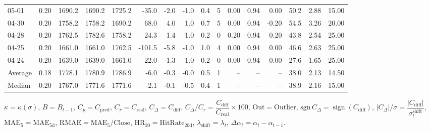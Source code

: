 \begin{threeparttable}
{\begin{tabular}{lrrrrrrrrrrrrrrr}
  05-01 &     0.20 & 1690.2 & 1690.2 & 1725.2 &      -35.0 &           -2.0 &                     -1.0 &                 0.4 &              5 &       0.00 &      0.94 &           0.00 &             50.2 &            2.88 &                  15.00 \\
  04-30 &     0.20 & 1758.2 & 1758.2 & 1690.2 &       68.0 &            4.0 &                      1.0 &                 0.7 &              5 &       0.00 &      0.94 &          -0.20 &             54.5 &            3.26 &                  20.00 \\
  04-28 &     0.20 & 1762.5 & 1782.6 & 1758.2 &       24.3 &            1.4 &                      1.0 &                 0.2 &              0 &       0.20 &      0.94 &           0.20 &             43.8 &            2.54 &                  25.00 \\
  04-25 &     0.20 & 1661.0 & 1661.0 & 1762.5 &     -101.5 &           -5.8 &                     -1.0 &                 1.0 &              4 &       0.00 &      0.94 &           0.00 &             46.6 &            2.63 &                  25.00 \\
  04-24 &     0.20 & 1639.0 & 1639.0 & 1661.0 &      -22.0 &           -1.3 &                     -1.0 &                 0.2 &              0 &       0.00 &      0.94 &           0.00 &             27.6 &            1.65 &                  25.00 \\
Average &     0.18 & 1778.1 & 1780.9 & 1786.9 &       -6.0 &           -0.3 &                     -0.0 &                 0.5 &              1 &         -- &        -- &             -- &             38.0 &            2.13 &                  14.50 \\
 Median &     0.20 & 1767.0 & 1771.6 & 1771.6 &       -2.1 &           -0.1 &                     -0.5 &                 0.4 &              1 &         -- &        -- &             -- &             38.9 &            2.16 &                  15.00 \\
\bottomrule
\end{tabular}
}
\begin{tablenotes}\footnotesize
\item $\kappa=\kappa(\sigma)$, $B=B_{t-1}$, $C_p=C_{\text{pred}}$, $C_r=C_{\text{real}}$, $C_\Delta=C_{\text{diff}}$, $C_\Delta/C_r=\dfrac{C_{\text{diff}}}{C_{\text{real}}}\times100$, $\mathrm{Out}=\text{Outlier}$, $\mathrm{sgn}\,C_\Delta=\operatorname{sign}(C_{\text{diff}})$, $|C_\Delta|/\sigma=\dfrac{|C_{\text{diff}}|}{\sigma_t^{\text{shift}}}$, $\mathrm{MAE}_5=\mathrm{MAE}_{5\text{d}}$, $\mathrm{RMAE}= \mathrm{MAE}_5 / \text{Close}$, $\mathrm{HR}_{20}=\mathrm{HitRate}_{20\text{d}}$, 
$\lambda_{\text{shift}}=\lambda_t$, 
$\Delta\alpha_t=\alpha_t-\alpha_{t-1}$.
\end{tablenotes}
\end{threeparttable}
\endgroup

